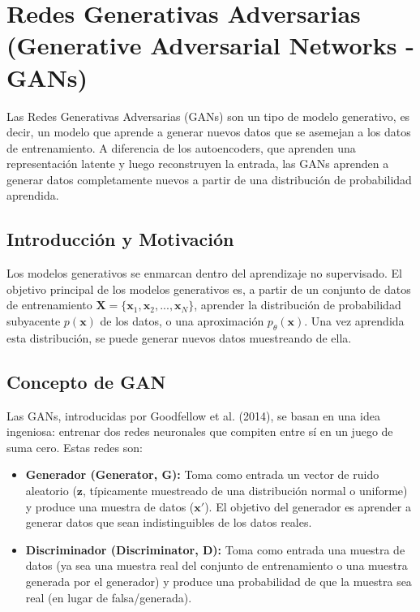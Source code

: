 \documentclass{article}
\begin{document}
\section{Redes Generativas Adversarias (Generative Adversarial Networks - GANs)}

Las Redes Generativas Adversarias (GANs) son un tipo de modelo generativo, es decir, un modelo que aprende a generar nuevos datos que se asemejan a los datos de entrenamiento.  A diferencia de los autoencoders, que aprenden una representación latente y luego reconstruyen la entrada, las GANs aprenden a generar datos completamente nuevos a partir de una distribución de probabilidad aprendida.

\subsection{Introducción y Motivación}

Los modelos generativos se enmarcan dentro del aprendizaje no supervisado. El objetivo principal de los modelos generativos es, a partir de un conjunto de datos de entrenamiento \(\mathbf{X} = \{\mathbf{x}_1, \mathbf{x}_2, ..., \mathbf{x}_N\}\), aprender la distribución de probabilidad subyacente \(p(\mathbf{x})\) de los datos, o una aproximación \(p_\theta(\mathbf{x})\). Una vez aprendida esta distribución, se puede generar nuevos datos muestreando de ella.

\subsection{Concepto de GAN}

Las GANs, introducidas por Goodfellow et al. (2014), se basan en una idea ingeniosa: entrenar dos redes neuronales que compiten entre sí en un juego de suma cero. Estas redes son:

\begin{itemize}
    \item \textbf{Generador (Generator, G):}  Toma como entrada un vector de ruido aleatorio (\(\mathbf{z}\), típicamente muestreado de una distribución normal o uniforme) y produce una muestra de datos (\(\mathbf{x}'\)).  El objetivo del generador es aprender a generar datos que sean indistinguibles de los datos reales.

    \item \textbf{Discriminador (Discriminator, D):}  Toma como entrada una muestra de datos (ya sea una muestra real del conjunto de entrenamiento o una muestra generada por el generador) y produce una probabilidad de que la muestra sea real (en lugar de falsa/generada).
\end{itemize}
\end{document}
